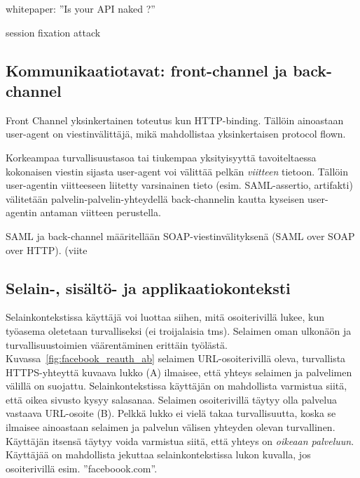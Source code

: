 \documentclass[finnish,gradu]{tktltiki}
\begin{document}
  whitepaper: ''Is your API naked ?''

  session fixation attack %



  \subsection{Kommunikaatiotavat: front-channel ja back-channel} %
  \label{sub:kommunikaatiotavat_front_channel_ja_back_channel}

  Front Channel yksinkertainen toteutus kun HTTP-binding. Tällöin ainoastaan user-agent on viestinvälittäjä, mikä mahdollistaa yksinkertaisen protocol flown.

  Korkeampaa turvallisuustasoa tai tiukempaa yksityisyyttä tavoiteltaessa kokonaisen viestin sijasta user-agent voi välittää pelkän \emph{viitteen} tietoon. Tällöin user-agentin viitteeseen liitetty varsinainen tieto (esim. SAML-assertio, artifakti) välitetään palvelin-palvelin-yhteydellä back-channelin kautta kyseisen user-agentin antaman viitteen perustella.

  SAML ja back-channel määritellään SOAP-viestinvälityksenä (SAML over SOAP over HTTP).
  (viite %



  \subsection{Selain-, sisältö- ja applikaatiokonteksti} %
  \label{sub:selainkonteksti_vs_applikaatiokonteksti}

  Selainkontekstissa käyttäjä voi luottaa siihen, mitä osoiterivillä lukee, kun työasema oletetaan turvalliseksi (ei troijalaisia tms). Selaimen oman ulkonäön ja turvallisuustoimien väärentäminen erittäin työlästä. Kuvassa~\ref{fig:facebook_reauth_ab} selaimen URL-osoiterivillä oleva, turvallista HTTPS-yhteyttä kuvaava lukko (A) ilmaisee, että yhteys selaimen ja palvelimen välillä on suojattu. Selainkontekstissa käyttäjän on mahdollista varmistua siitä, että oikea sivusto kysyy salasanaa. Selaimen osoiterivillä täytyy olla palvelua vastaava URL-osoite (B). Pelkkä lukko ei vielä takaa turvallisuutta, koska se ilmaisee ainoastaan selaimen ja palvelun välisen yhteyden olevan turvallinen. Käyttäjän itsensä täytyy voida varmistua siitä, että yhteys on \emph{oikeaan palveluun}. Käyttäjää on mahdollista jekuttaa selainkontekstissa lukon kuvalla, jos osoiterivillä esim. ''faceboook.com''.
\end{document}
